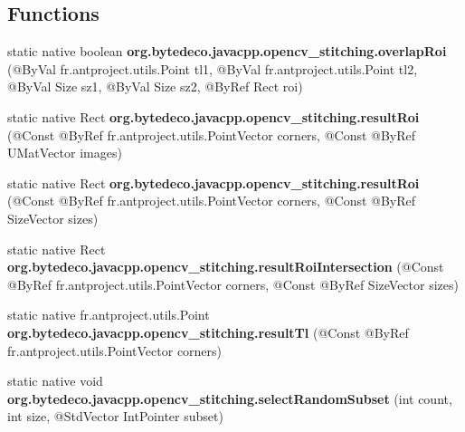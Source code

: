 \subsection*{Functions}
\begin{DoxyCompactItemize}
\item 
\mbox{\label{group__stitching_gacf4ed576f958ddf1bc53f06ef4d33df6}} 
static native boolean {\bfseries org.\+bytedeco.\+javacpp.\+opencv\+\_\+stitching.\+overlap\+Roi} (@By\+Val fr.antproject.utils.Point tl1, @By\+Val fr.antproject.utils.Point tl2, @By\+Val Size sz1, @By\+Val Size sz2, @By\+Ref Rect roi)
\item 
\mbox{\label{group__stitching_ga859ea44005cd9edc8317630a7334e1b6}} 
static native Rect {\bfseries org.\+bytedeco.\+javacpp.\+opencv\+\_\+stitching.\+result\+Roi} (@Const @By\+Ref fr.antproject.utils.Point\+Vector corners, @Const @By\+Ref U\+Mat\+Vector images)
\item 
\mbox{\label{group__stitching_gad2b343099d0b16c7ba33993e922eed86}} 
static native Rect {\bfseries org.\+bytedeco.\+javacpp.\+opencv\+\_\+stitching.\+result\+Roi} (@Const @By\+Ref fr.antproject.utils.Point\+Vector corners, @Const @By\+Ref Size\+Vector sizes)
\item 
\mbox{\label{group__stitching_gaa882d01ddd9b9cfa030cf3436340973f}} 
static native Rect {\bfseries org.\+bytedeco.\+javacpp.\+opencv\+\_\+stitching.\+result\+Roi\+Intersection} (@Const @By\+Ref fr.antproject.utils.Point\+Vector corners, @Const @By\+Ref Size\+Vector sizes)
\item 
\mbox{\label{group__stitching_gaa820d4f157eabdece019843e7334f493}} 
static native fr.antproject.utils.Point {\bfseries org.\+bytedeco.\+javacpp.\+opencv\+\_\+stitching.\+result\+Tl} (@Const @By\+Ref fr.antproject.utils.Point\+Vector corners)
\item 
\mbox{\label{group__stitching_ga8e152fb5af89a56c5ffc2eb169f19162}} 
static native void {\bfseries org.\+bytedeco.\+javacpp.\+opencv\+\_\+stitching.\+select\+Random\+Subset} (int count, int size, @Std\+Vector Int\+Pointer subset)
\item 
\mbox{\label{group__stitching_gae2a83ff8768a6a4016b4f365943ad96f}} 

\end{DoxyCompactItemize}
